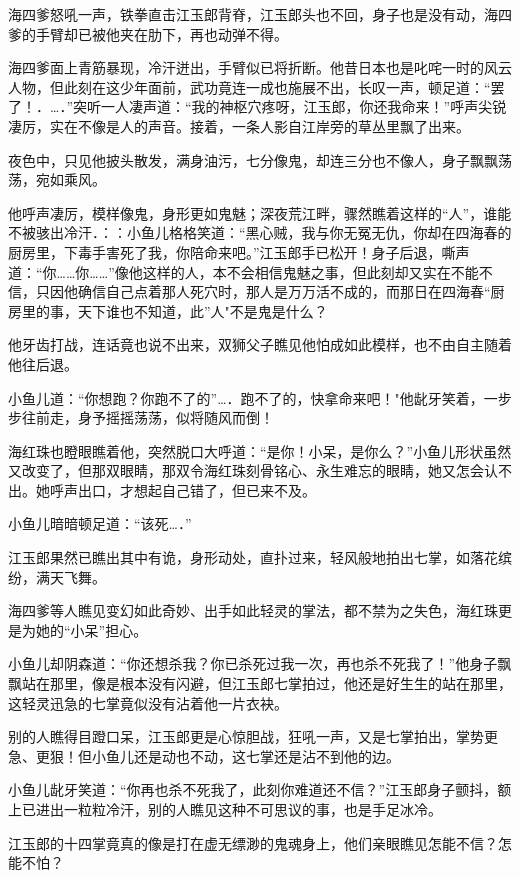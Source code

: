 \documentclass[12pt,oneside]{book}
\begin{document}
海四爹怒吼一声，铁拳直击江玉郎背脊，江玉郎头也不回，身子也是没有动，海四爹的手臂却已被他夹在肋下，再也动弹不得。

海四爹面上青筋暴现，冷汗迸出，手臂似已将折断。他昔日本也是叱咤一时的风云人物，但此刻在这少年面前，武功竟连一成也施展不出，长叹一声，顿足道：``罢了！．\ldots．''突听一人凄声道：``我的神枢穴疼呀，江玉郎，你还我命来！''呼声尖锐凄厉，实在不像是人的声音。接着，一条人影自江岸旁的草丛里飘了出来。

夜色中，只见他披头散发，满身油污，七分像鬼，却连三分也不像人，身子飘飘荡荡，宛如乘风。

他呼声凄厉，模样像鬼，身形更如鬼魅；深夜荒江畔，骤然瞧着这样的``人''，谁能不被骇出冷汗．：：小鱼儿格格笑道：``黑心贼，我与你无冤无仇，你却在四海春的厨房里，下毒手害死了我，你陪命来吧。''江玉郎手已松开！身子后退，嘶声道：``你\ldots\ldots 你\ldots\ldots{}''像他这样的人，本不会相信鬼魅之事，但此刻却又实在不能不信，只因他确信自己点着那人死穴时，那人是万万活不成的，而那日在四海春``厨房里的事，天下谁也不知道，此''人"不是鬼是什么？

他牙齿打战，连话竟也说不出来，双狮父子瞧见他怕成如此模样，也不由自主随着他往后退。

小鱼儿道：``你想跑？你跑不了的''\ldots．跑不了的，快拿命来吧！"他龀牙笑着，一步步往前走，身予摇摇荡荡，似将随风而倒！

海红珠也瞪眼瞧着他，突然脱口大呼道：``是你！小呆，是你么？''小鱼儿形状虽然又改变了，但那双眼睛，那双令海红珠刻骨铭心、永生难忘的眼睛，她又怎会认不出。她呼声出口，才想起自己错了，但已来不及。

小鱼儿暗暗顿足道：``该死\ldots．''

江玉郎果然已瞧出其中有诡，身形动处，直扑过来，轻风般地拍出七掌，如落花缤纷，满天飞舞。

海四爹等人瞧见变幻如此奇妙、出手如此轻灵的掌法，都不禁为之失色，海红珠更是为她的``小呆''担心。

小鱼儿却阴森道：``你还想杀我？你已杀死过我一次，再也杀不死我了！''他身子飘飘站在那里，像是根本没有闪避，但江玉郎七掌拍过，他还是好生生的站在那里，这轻灵迅急的七掌竟似没有沾着他一片衣袂。

别的人瞧得目蹬口呆，江玉郎更是心惊胆战，狂吼一声，又是七掌拍出，掌势更急、更狠！但小鱼儿还是动也不动，这七掌还是沾不到他的边。

小鱼儿龀牙笑道：``你再也杀不死我了，此刻你难道还不信？''江玉郎身子颤抖，额上已进出一粒粒冷汗，别的人瞧见这种不可思议的事，也是手足冰冷。

江玉郎的十四掌竟真的像是打在虚无缥渺的鬼魂身上，他们亲眼瞧见怎能不信？怎能不怕？
\end{document}
